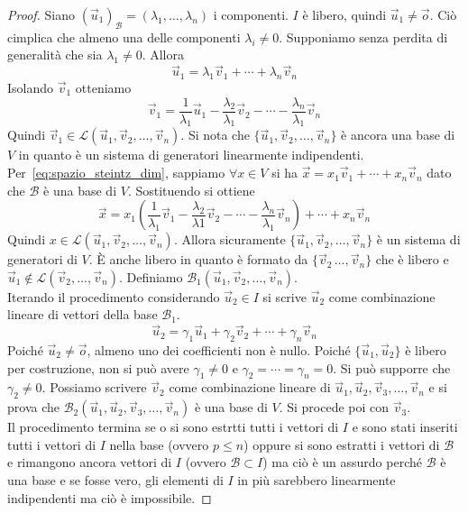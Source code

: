 \begin{proof}
  Siano ${(\vec{u}_1)}_\mathscr{B}=(\lambda_1,\ldots,\lambda_n)$ i componenti. $I$ è
  libero, quindi $\vec{u}_1\neq\vec{o}$. Ciò cimplica che almeno una delle componenti
  $\lambda_i\neq0$. Supponiamo senza perdita di generalità che sia $\lambda_1\neq0$.
  Allora
  \begin{equation}\label{eq:spazio_steintz_dim}
    \vec{u}_1=\lambda_1\vec{v}_1+\cdots+\lambda_n\vec{v}_n\tag{$\star$}
  \end{equation}
  Isolando $\vec{v}_1$ otteniamo
  \begin{equation*}
    \vec{v}_1 =
    \frac{1}{\lambda_1}\vec{u}_1-\frac{\lambda_2}{\lambda_1}\vec{v}_2-\cdots-
    \frac{\lambda_n}{\lambda_1}\vec{v}_n
  \end{equation*}
  Quindi $\vec{v}_1\in\mathscr{L}(\vec{u}_1,\vec{v}_2,\ldots,\vec{v}_n)$. Si nota che
  $\{\vec{u}_1,\vec{v}_2,\ldots,\vec{v}_n\}$ è ancora una base di $V$ in quanto è un
  sistema di generatori linearmente indipendenti.\\
  Per~\eqref{eq:spazio_steintz_dim}, sappiamo $\forall x\in V$ si ha
  $\vec{x}=x_1\vec{v}_1+\cdots+x_n\vec{v}_n$ dato che $\mathscr{B}$ è una base di $V$.
  Sostituendo si ottiene
  \begin{equation*}
    \vec{x}=x_1 \left(
      \frac{1}{\lambda_1}\vec{v}_1-\frac{\lambda_2}{\lambda1}\vec{v}_2-\cdots-
    \frac{\lambda_n}{\lambda_1}\vec{v}_n\right)+\cdots+x_n\vec{v}_n
  \end{equation*}
  Quindi $x\in\mathscr{L}(\vec{u}_1,\vec{v}_2,\ldots,\vec{v}_n)$. Allora sicuramente
  $\{\vec{u}_1,\vec{v}_2,\ldots,\vec{v}_n\}$ è un sistema di generatori di $V$. È anche
  libero in quanto è formato da $\{\vec{v}_2\,\ldots,\vec{v}_n\}$ che è libero e
  $\vec{u}_1\notin\mathscr{L}(\vec{v}_2,\ldots,\vec{v}_n)$. Definiamo
  $\mathscr{B}_1(\vec{u}_1,\vec{v}_2,\ldots,\vec{v}_n)$.\\
  Iterando il procedimento considerando $\vec{u}_2\in I$ si scrive $\vec{u}_2$ come
  combinazione lineare di vettori della base $\mathscr{B}_1$.
  \begin{equation*}
    \vec{u}_2=\gamma_1\vec{u}_1+\gamma_2\vec{v}_2+\cdots+\gamma_n\vec{v}_n
  \end{equation*}
  Poiché $\vec{u}_2\neq\vec{o}$, almeno uno dei coefficienti non è nullo. Poiché
  $\{\vec{u}_1,\vec{u}_2\}$ è libero per costruzione, non si può avere $\gamma_1\neq0$ e
  $\gamma_2=\cdots=\gamma_n=0$. Si può supporre che $\gamma_2\neq0$. Possiamo scrivere
  $\vec{v}_2$ come combinazione lineare di
  $\vec{u}_1,\vec{u}_2,\vec{v}_3,\ldots,\vec{v}_n$ e si prova che
  $\mathscr{B}_2(\vec{u}_1,\vec{u}_2,\vec{v}_3,\ldots,\vec{v}_n)$ è una base di $V$. Si
  procede poi con $\vec{v}_3$.\\
  Il procedimento termina se o si sono estrtti tutti i vettori di $I$ e sono stati
  inseriti tutti i vettori di $I$ nella base (ovvero $p\leq n$) oppure si sono estratti
  i vettori di $\mathscr{B}$ e rimangono ancora vettori di $I$ (ovvero
  $\mathscr{B}\subset I$) ma ciò è un assurdo perché $\mathscr{B}$ è una base e se fosse
  vero, gli elementi di $I$ in più sarebbero linearmente indipendenti ma ciò è
  impossibile.
\end{proof}

